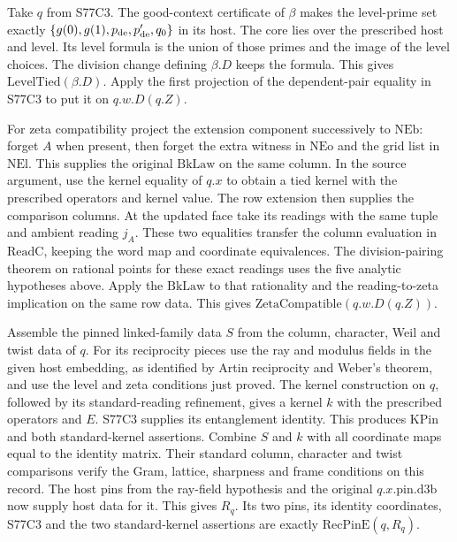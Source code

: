 Take $q$ from S77C3. The good-context certificate of $\beta$ makes
the level-prime set exactly
$\{g(0),g(1),p_{\rm de},p'_{\rm de},q_0\}$ in its host. The
core lies over the prescribed host and level. Its level formula is
the union of those primes and the image of the level choices. The
division change defining $\beta.D$ keeps the formula. This gives
$\mathrm{LevelTied}(\beta.D)$. Apply the first projection of
the dependent-pair equality in S77C3 to put it on $q.w.D(q.Z)$.

For zeta compatibility project the extension component successively
to $\mathrm{NEb}$: forget $A$ when present, then forget the extra
witness in $\mathrm{NEo}$ and the grid list in $\mathrm{NEl}$.
This supplies the original $\mathrm{BkLaw}$ on the same column.
In the source argument, use the kernel equality of $q.x$ to obtain
a tied kernel with the prescribed operators and kernel value. The
row extension then supplies the comparison columns. At the updated
face take its readings with the same tuple and ambient reading
$j_A$. These two equalities transfer the column evaluation in
$\mathrm{ReadC}$, keeping the word map and coordinate equivalences.
The division-pairing theorem on rational points for these exact
readings uses the five analytic hypotheses above. Apply the
$\mathrm{BkLaw}$ to that rationality and the reading-to-zeta
implication on the same row data. This gives
$\mathrm{ZetaCompatible}(q.w.D(q.Z))$.

Assemble the pinned linked-family data $S$ from the column,
character, Weil and twist data of $q$. For its reciprocity pieces
use the ray and modulus fields in the given host embedding,
as identified by Artin reciprocity and Weber's theorem, and use the
level and zeta conditions just proved. The kernel construction
on $q$, followed by its standard-reading refinement, gives a
kernel $k$ with the prescribed operators and $E$. S77C3 supplies
its entanglement identity. This produces $\mathrm{KPin}$ and both
standard-kernel assertions. Combine $S$ and $k$ with all coordinate
maps equal to the identity matrix. Their standard column, character
and twist comparisons verify the Gram, lattice, sharpness and frame
conditions on this record. The host pins from the ray-field
hypothesis and the original $q.x.\mathrm{pin}.\mathrm{d3b}$ now
supply host data for it. This gives $R_q$. Its two pins, its identity
coordinates, S77C3 and the two standard-kernel assertions are
exactly $\mathrm{RecPinE}(q,R_q)$.

